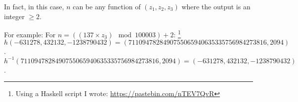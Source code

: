         In fact, in this case, $n$ can be any function of $(z_1,z_2,z_3)$ where the output is an integer $\geq 2$.
        
        For example: For $n =  ((137 \times z_3) \mod 100003) + 2$: 
        \footnote{Using a Haskell script I wrote: \url{https://pastebin.com/nTEV7QvR}}
        \\ 
        $h(-631278, 432132, -1238790432) = (7110947828490755065940635335756984273816, 2094)$. \\ 
        $h^{-1}(7110947828490755065940635335756984273816, 2094) = (-631278, 432132, -1238790432)$.